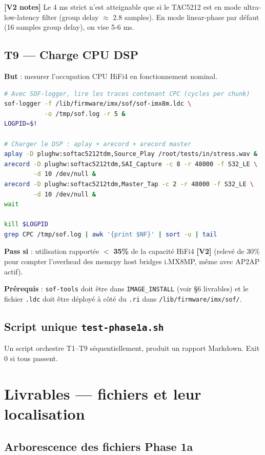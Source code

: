 \documentclass[11pt,a4paper]{article}
\begin{document}
\textbf{[V2 notes]} Le 4 ms strict n'est atteignable que si le TAC5212 est en mode ultra-low-latency filter (group delay $\approx$ 2.8 samples). En mode linear-phase par défaut (16 samples group delay), on vise 5-6 ms.

\subsection{T9 --- Charge CPU DSP}
\textbf{But} : mesurer l'occupation CPU HiFi4 en fonctionnement nominal.
\begin{lstlisting}[language=bash]
# Avec SOF-logger, lire les traces contenant CPC (cycles per chunk)
sof-logger -f /lib/firmware/imx/sof/sof-imx8m.ldc \
           -o /tmp/sof.log -r 5 &
LOGPID=$!

# Charger le DSP : aplay + arecord + arecord master
aplay -D plughw:softac5212tdm,Source_Play /root/tests/in/stress.wav &
arecord -D plughw:softac5212tdm,SAI_Capture -c 8 -r 48000 -f S32_LE \
        -d 10 /dev/null &
arecord -D plughw:softac5212tdm,Master_Tap -c 2 -r 48000 -f S32_LE \
        -d 10 /dev/null &
wait

kill $LOGPID
grep CPC /tmp/sof.log | awk '{print $NF}' | sort -u | tail
\end{lstlisting}
\textbf{Pass si} : utilisation rapportée $<$ \textbf{35\%} de la capacité HiFi4 \textbf{[V2]} (relevé de 30\% pour compter l'overhead des memcpy host bridges i.MX8MP, même avec AP2AP actif).

\textbf{Prérequis} : \texttt{sof-tools} doit être dans \texttt{IMAGE\_INSTALL} (voir §6 livrables) et le fichier \texttt{.ldc} doit être déployé à côté du \texttt{.ri} dans \texttt{/lib/firmware/imx/sof/}.

\subsection{Script unique \texttt{test-phase1a.sh}}
Un script orchestre T1--T9 séquentiellement, produit un rapport Markdown. Exit 0 si tous passent.

\clearpage
\section{Livrables --- fichiers et leur localisation}

\subsection{Arborescence des fichiers Phase 1a}
\end{document}
